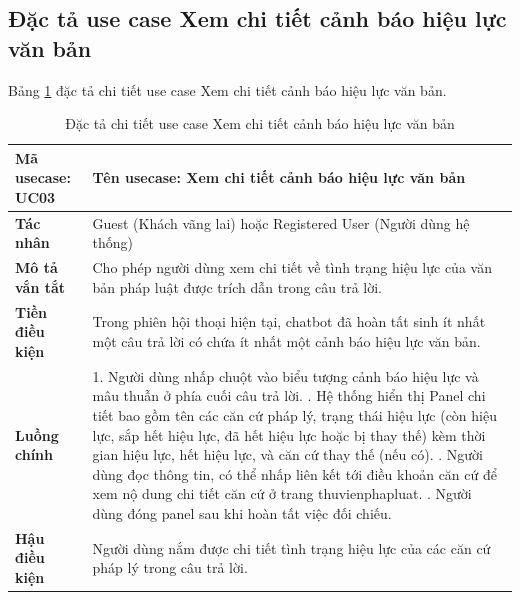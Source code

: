 \documentclass[../DoAn.tex]{subfiles}
\begin{document}
\subsection{Đặc tả use case Xem chi tiết cảnh báo hiệu lực văn bản}
Bảng \ref{table:uc_specs_validity} đặc tả chi tiết use case Xem chi tiết cảnh báo hiệu lực văn bản.
\begin{table}[H]
\centering
\begin{tabular}{|p{3.5cm}|p{11.5cm}|}
\hline
\textbf{Mã usecase:} UC03 & \textbf{Tên usecase:} Xem chi tiết cảnh báo hiệu lực văn bản \\ \hline
\textbf{Tác nhân} & Guest (Khách vãng lai) hoặc Registered User (Người dùng hệ thống) \\ \hline
\textbf{Mô tả vắn tắt} & Cho phép người dùng xem chi tiết về tình trạng hiệu lực của văn bản pháp luật được trích dẫn trong câu trả lời. \\ \hline
\textbf{Tiền điều kiện} & Trong phiên hội thoại hiện tại, chatbot đã hoàn tất sinh ít nhất một câu trả lời có chứa ít nhất một cảnh báo hiệu lực văn bản. \\ \hline
\textbf{Luồng chính} &
1. Người dùng nhấp chuột vào biểu tượng cảnh báo hiệu lực và mâu thuẫn ở phía cuối câu trả lời. \newline
2. Hệ thống hiển thị Panel chi tiết bao gồm tên các căn cứ pháp lý, trạng thái hiệu lực (còn hiệu lực, sắp hết hiệu lực, đã hết hiệu lực hoặc bị thay thế) kèm thời gian hiệu lực, hết hiệu lực, và căn cứ thay thế (nếu có). \newline
3. Người dùng đọc thông tin, có thể nhấp liên kết tới điều khoản căn cứ để xem nộ dung chi tiết căn cứ ở trang thuvienphapluat. \newline
4. Người dùng đóng panel sau khi hoàn tất việc đối chiếu. \\ \hline
\textbf{Hậu điều kiện} & Người dùng nắm được chi tiết tình trạng hiệu lực của các căn cứ pháp lý trong câu trả lời. \\ \hline
\end{tabular}
\caption{Đặc tả chi tiết use case Xem chi tiết cảnh báo hiệu lực văn bản}
\label{table:uc_specs_validity}
\end{table}
\end{document}
